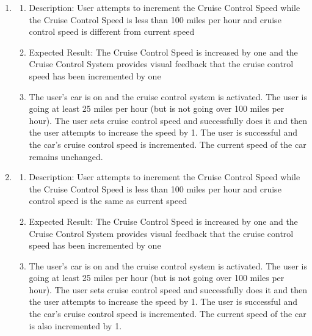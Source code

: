 \documentclass[preprint,11pt,3p]{article}
\begin{document}
\begin{enumerate}
	\item 
		\begin{enumerate}
	\item Description: User attempts to increment the Cruise Control Speed while the Cruise Control Speed is less than 100 miles per hour and cruise control speed is different from current speed
	\item Expected Result: The Cruise Control Speed is increased by one and the Cruise Control System provides visual feedback that the cruise control speed has been incremented by one
	\item The user’s car is on and the cruise control system is activated. The user is going at least 25 miles per hour (but is not going over 100 miles per hour). The user sets cruise control speed and successfully does it and then the user attempts to increase the speed by 1. The user is successful and the car’s cruise control speed is incremented. The current speed of the car remains unchanged.
\end{enumerate}

	\item
		\begin{enumerate}
	\item Description: User attempts to increment the Cruise Control Speed while the Cruise Control Speed is less than 100 miles per hour and cruise control speed is the same as current speed
	\item Expected Result: The Cruise Control Speed is increased by one and the Cruise Control System provides visual feedback that the cruise control speed has been incremented by one
	\item The user’s car is on and the cruise control system is activated. The user is going at least 25 miles per hour (but is not going over 100 miles per hour). The user sets cruise control speed and successfully does it and then the user attempts to increase the speed by 1. The user is successful and the car’s cruise control speed is incremented. The current speed of the car is also incremented by 1.
\end{enumerate}


\end{enumerate}
\end{document}
